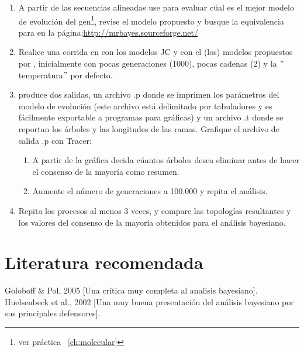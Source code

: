 \begin{enumerate} %

	\item A partir de las secuencias alineadas use  para evaluar c\'ual es el mejor modelo de evoluci\'on del gen\footnote{ver pr\'actica ~\ref{ch:molecular}}, revise el modelo propuesto y busque la equivalencia para  en la p\'agina:\url{http://mrbayes.sourceforge.net/}

	\item 	Realice una corrida en  con los modelos JC y con el (los) modelos propuestos por , inicialmente con pocas generaciones (1000), pocas cadenas (2) y la $"$temperatura$"$ por defecto.

	\item {} produce dos salidas, un archivo .p donde se imprimen los par\'ametros del modelo de evoluci\'on (este archivo est\'a delimitado por tabuladores y es f\'acilmente exportable a programas para gr\'aficas) y un archivo .t donde se reportan los \'arboles y las longitudes de las ramas. Grafique el archivo de salida .p con Tracer:

	\begin{enumerate} %
		\item A partir de la gr\'afica decida c\'uantos \'arboles desea eliminar antes de hacer el consenso de la mayor\'ia como resumen.


		\item Aumente el n\'umero de generaciones a 100.000 y repita el an\'alisis.
	\end{enumerate}	

	\item Repita los procesos al menos 3 veces, y compare las topolog\'ias resultantes y los valores del consenso de la mayor\'ia obtenidos para el an\'alisis bayesiano.

\end{enumerate}







\section*{Literatura recomendada}

Goloboff \& Pol, 2005 [Una cr\'itica muy completa al analisis bayesiano].\\
Huelsenbeck et al., 2002 [Una muy buena presentaci\'on del an\'alisis bayesiano por sus principales defensores].
